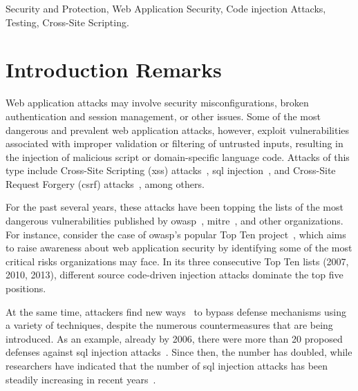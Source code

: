 \documentclass[conference]{IEEEtran}
\begin{document}
\begin{IEEEkeywords}
Security and Protection, Web Application Security, Code injection Attacks,
Testing, Cross-Site Scripting.
\end{IEEEkeywords}

\IEEEpeerreviewmaketitle

\section{Introduction Remarks}

Web application attacks may involve security misconfigurations, broken
authentication and session management, or other issues. Some of the
most dangerous and prevalent web application attacks, however,
exploit vulnerabilities associated with improper validation or filtering
of untrusted inputs, resulting in the injection of malicious
script or domain-specific language code.
Attacks of this type include Cross-Site Scripting ({\sc xss})
attacks~\cite{SG07}, {\sc sql} injection~\cite{RL12b}, and
Cross-Site Request Forgery ({\sc csrf}) attacks~\cite{LZRL09}, among
others.

For the past several years,
these attacks have been topping the lists of the most dangerous vulnerabilities
published by {\sc owasp}~\cite{OWASPtop10},
{\sc mitre}~\cite{MITREtop25}, and other organizations.
For instance, consider the case of {\sc owasp}'s popular Top Ten
project~\cite{OWASPtop10},
which aims to raise awareness about web application security by
identifying some of the most critical risks organizations may face.
In its three consecutive Top Ten lists (2007, 2010, 2013), different source
code-driven injection attacks dominate the top five positions.

At the same time, attackers find new ways~\cite{HNSHS12,DKH14}
to bypass defense mechanisms using a variety of techniques,
despite the numerous countermeasures that are being introduced.
As an example, already by 2006,
there were more than 20 proposed defenses
against {\sc sql} injection attacks~\cite{HVO06}.
Since then, the number has doubled, while researchers have indicated that
the number of {\sc sql} injection attacks has been steadily
increasing in recent years~\cite{SSL12}.
\end{document}
